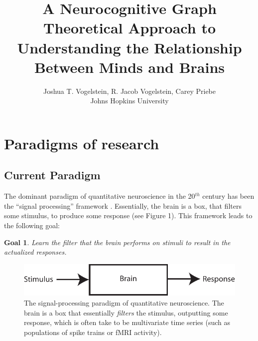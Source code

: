 
\usepackage{algorithmic}
\usepackage{algorithm}

\newtheorem{goal}{Goal}
\newtheorem{desid}{Desiderata}
\newcommand{\zz}{\mathbb{Z}}
\newcommand{\nec}{NeCoG}


\title{A Neurocognitive Graph Theoretical Approach to Understanding the Relationship Between Minds and Brains}

\author{Joshua T. Vogelstein, R. Jacob Vogelstein, Carey Priebe\\{Johns Hopkins University}}



\maketitle

\begin{abstract}
	
\end{abstract}

\section{Paradigms of research}
\subsection{Current Paradigm}

The dominant paradigm of quantitative neuroscience in the 20$^{th}$ century has been the ``signal processing'' framework \cite{}.  Essentially, the brain is a box, that filters some stimulus, to produce some response (see Figure 1). This framework leads to the following goal:

\begin{goal}
	Learn the filter that the brain performs on stimuli to result in the actualized responses.
\end{goal}

\begin{figure}[h!]
\centering \includegraphics{stim_brain_resp}
\caption{The signal-processing paradigm of quantitative neuroscience.  The brain is a box that essentially \emph{filters} the stimulus, outputting some response, which is often take to be multivariate time series (such as populations of spike trains or fMRI activity).} \label{fig:SBR}
\end{figure}


